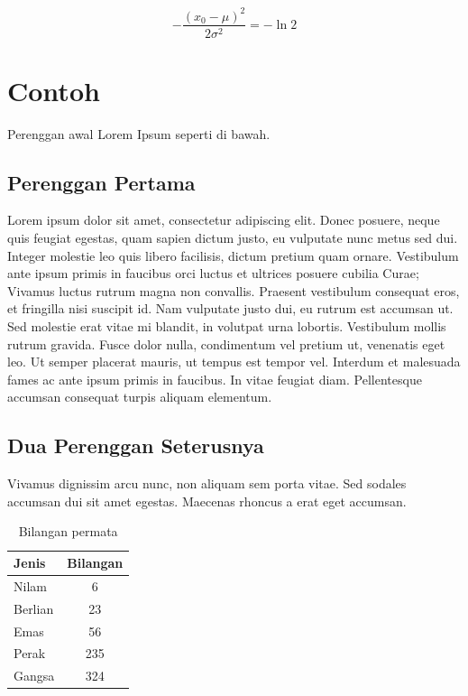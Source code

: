 \begin{equation}
-\frac{(x_0 - \mu)^2}{2 \sigma^2} = -\ln 2
\end{equation}


\section{Contoh}
\label{sec:contol}

Perenggan awal Lorem Ipsum seperti di bawah.

\subsection{Perenggan Pertama}

Lorem ipsum dolor sit amet, consectetur adipiscing elit. Donec posuere, neque quis feugiat egestas, quam sapien dictum justo, eu vulputate nunc metus sed dui. Integer molestie leo quis libero facilisis, dictum pretium quam ornare. Vestibulum ante ipsum primis in faucibus orci luctus et ultrices posuere cubilia Curae; Vivamus luctus rutrum magna non convallis. Praesent vestibulum consequat eros, et fringilla nisi suscipit id. Nam vulputate justo dui, eu rutrum est accumsan ut. Sed molestie erat vitae mi blandit, in volutpat urna lobortis. Vestibulum mollis rutrum gravida. Fusce dolor nulla, condimentum vel pretium ut, venenatis eget leo. Ut semper placerat mauris, ut tempus est tempor vel. Interdum et malesuada fames ac ante ipsum primis in faucibus. In vitae feugiat diam. Pellentesque accumsan consequat turpis aliquam elementum.


\subsection{Dua Perenggan Seterusnya}

Vivamus dignissim arcu nunc, non aliquam sem porta vitae. Sed sodales accumsan dui sit amet egestas. Maecenas rhoncus a erat eget accumsan.

\begin{table}[hbt!]\centering
\caption{Bilangan permata}

\begin{tabular}{l c}
\hline
Jenis & Bilangan \\\hline
Nilam & 6\\
Berlian & 23\\
Emas & 56\\
Perak & 235\\
Gangsa & 324\\\hline
\end{tabular}
\end{table}

